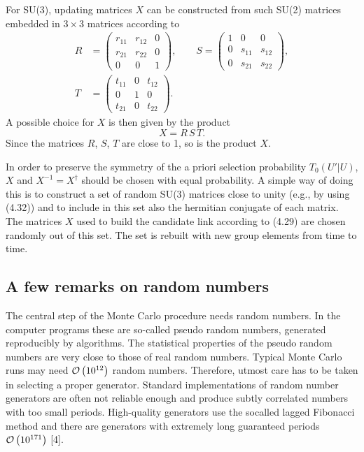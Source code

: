 For SU(3), updating matrices $X$ can be constructed from such SU(2) matrices embedded in $3\times3$ matrices according to
\begin{equation}
  \begin{split}
    R &= \begin{pmatrix} r_{11} & r_{12} & 0 \\ r_{21} & r_{22} & 0 \\ 0 & 0 & 1 \end{pmatrix}, \qquad
    S = \begin{pmatrix} 1 & 0 & 0 \\ 0 & s_{11} & s_{12} \\ 0 & s_{21} & s_{22} \end{pmatrix}, \\
    T &= \begin{pmatrix} t_{11} & 0 & t_{12} \\ 0 & 1 & 0 \\ t_{21} & 0 & t_{22} \end{pmatrix}.
  \end{split}
\end{equation}
A possible choice for $X$ is then given by the product
\begin{equation}
  X = R\,S\,T .
\end{equation}
Since the matrices $R$, $S$, $T$ are close to 1, so is the product $X$.

In order to preserve the symmetry of the a priori selection probability
$T_0(U'|U)$, $X$ and $X^{-1} = X^\dagger$ should be chosen with equal probability. A
simple way of doing this is to construct a set of random SU(3) matrices close
to unity (e.g., by using (4.32)) and to include in this set also the hermitian
conjugate of each matrix. The matrices $X$ used to build the candidate link
according to (4.29) are chosen randomly out of this set. The set is rebuilt with
new group elements from time to time.

\subsection{A few remarks on random numbers}

The central step of the Monte Carlo procedure needs random numbers. In the
computer programs these are so-called pseudo random numbers, generated
reproducibly by algorithms. The statistical properties of the pseudo random
numbers are very close to those of real random numbers. Typical Monte Carlo
runs may need $\mathcal{O}\left(10^{12}\right)$ random numbers. Therefore, utmost care has to be
taken in selecting a proper generator. Standard implementations of random
number generators are often not reliable enough and produce subtly correlated numbers with too small periods. High-quality generators use the socalled lagged Fibonacci method and there are generators with extremely long
guaranteed periods $\mathcal{O}\left(10^{171}\right)$ [4].

